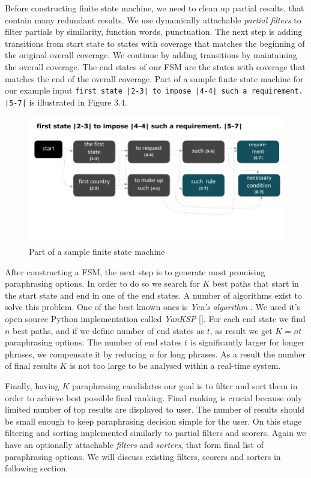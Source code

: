 Before constructing finite state machine, we need to clean up partial results, that contain many redundant results. We use dynamically attachable \emph{partial filters} to filter partials by similarity, function words, punctuation. The next step is adding transitions from start state to states with coverage that matches the beginning of the original overall coverage. We continue by adding transitions by maintaining the overall coverage. The end states of our FSM are the states with coverage that matches the end of the overall coverage. Part of a sample finite state machine for our example input \texttt{first state |2-3| to impose |4-4| such a requirement. |5-7|} is illustrated in Figure 3.4.

\begin{figure}
 \centering 
 \includegraphics{g/fsm.pdf}
 \caption{Part of a sample finite state machine}
\end{figure}

After constructing a FSM, the next step is to generate most promising paraphrasing options. In order to do so we search for $K$ best paths that start in the start state and end in one of the end states. A number of algorithms exist to solve this problem. One of the best known ones is \emph{Yen's algorithm} \cite{yen1971finding}. We used it's open source Python implementation called \emph{YanKSP} []. For each end state we find $n$ best paths, and if we define number of end states as $t$, as result we get $K = nt$ paraphrasing options. The number of end states $t$ is significantly larger for longer phrases, we compensate it by reducing $n$ for long phrases. As a result the number of final results $K$ is not too large to be analysed within a real-time system.

Finally, having $K$ paraphrasing candidates our goal is to filter and sort them in order to achieve best possible final ranking. Final ranking is crucial because only limited number of top results are displayed to user. The number of results should be small enough to keep paraphrasing decision simple for the user. On this stage filtering and sorting implemented similarly to partial filters and scorers. Again we have an optionally attachable \emph{filters} and \emph{sorters}, that form final list of paraphrasing options. We will discuss existing filters, scorers and sorters in following section.


